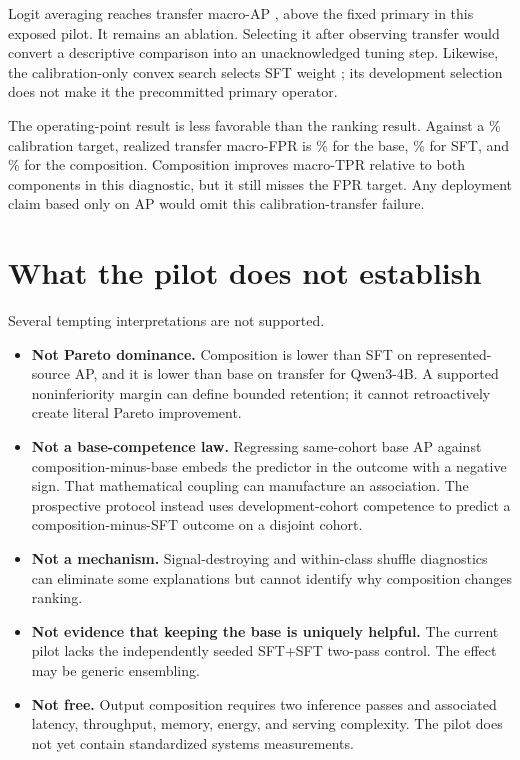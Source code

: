 \documentclass[11pt]{article}
\begin{document}


Logit averaging reaches transfer macro-AP \PilotLogitTransfer{}, above the fixed primary in this
exposed pilot.  It remains an ablation.  Selecting it after observing transfer would convert a
descriptive comparison into an unacknowledged tuning step.  Likewise, the calibration-only convex
search selects SFT weight \PilotConvexWeight{}; its development selection does not make it the
precommitted primary operator.



The operating-point result is less favorable than the ranking result.  Against a
\PilotTargetFPRPct\% calibration target, realized transfer macro-FPR is
\PilotBaseTransferFPRPct\% for the base, \PilotSFTTransferFPRPct\% for SFT, and
\PilotCompositionTransferFPRPct\% for the composition.  Composition improves macro-TPR relative
to both components in this diagnostic, but it still misses the FPR target.  Any deployment claim
based only on AP would omit this calibration-transfer failure.

\section{What the pilot does not establish}
\label{sec:not-establish}

Several tempting interpretations are not supported.

\begin{itemize}[leftmargin=1.5em]
  \item \textbf{Not Pareto dominance.} Composition is lower than SFT on represented-source AP,
  and it is lower than base on transfer for Qwen3-4B.  A supported noninferiority margin can define
  bounded retention; it cannot retroactively create literal Pareto improvement.

  \item \textbf{Not a base-competence law.} Regressing same-cohort base AP against
  composition-minus-base embeds the predictor in the outcome with a negative sign.  That
  mathematical coupling can manufacture an association.  The prospective protocol instead uses
  development-cohort competence to predict a composition-minus-SFT outcome on a disjoint cohort.

  \item \textbf{Not a mechanism.} Signal-destroying and within-class shuffle diagnostics can
  eliminate some explanations but cannot identify why composition changes ranking.

  \item \textbf{Not evidence that keeping the base is uniquely helpful.} The current pilot lacks
  the independently seeded SFT+SFT two-pass control.  The effect may be generic ensembling.

  \item \textbf{Not free.} Output composition requires two inference passes and associated
  latency, throughput, memory, energy, and serving complexity.  The pilot does not yet contain
  standardized systems measurements.
\end{itemize}
\end{document}
